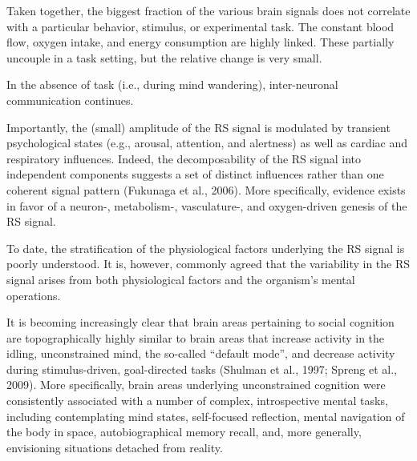 \documentclass[authoryear,review,3p]{elsarticle}
\begin{document}
Taken together, the biggest fraction of the various brain signals does not correlate with a particular behavior, stimulus, or experimental task. The constant blood flow, oxygen intake, and energy consumption are highly linked. These partially uncouple in a task setting, but the relative change is very small.

In the absence of task (i.e., during mind wandering), inter-neuronal communication continues.

Importantly, the (small) amplitude of the RS signal is modulated by transient psychological states (e.g., arousal, attention, and alertness) as well as cardiac and respiratory influences. Indeed, the decomposability of the RS signal into independent components suggests a set of distinct influences rather than one coherent signal pattern (Fukunaga et al., 2006). More specifically, evidence exists in favor of a neuron-, metabolism-, vasculature-, and oxygen-driven genesis of the RS signal. 

To date, the stratification of the physiological factors underlying the RS signal is poorly understood. It is, however, commonly agreed that the variability in the RS signal arises from both physiological factors and the organism's mental operations.

It is becoming increasingly clear that brain areas pertaining to social cognition are topographically highly similar to brain areas that increase activity in the idling, unconstrained mind, the so-called “default mode”, and decrease activity during stimulus-driven, goal-directed tasks (Shulman et al., 1997; Spreng et al., 2009). More specifically, brain areas underlying unconstrained cognition were consistently associated with a number of complex, introspective mental tasks, including contemplating mind states, self-focused reflection, mental navigation of the body in space, autobiographical memory recall, and, more generally, envisioning situations detached from reality. 
\end{document}
